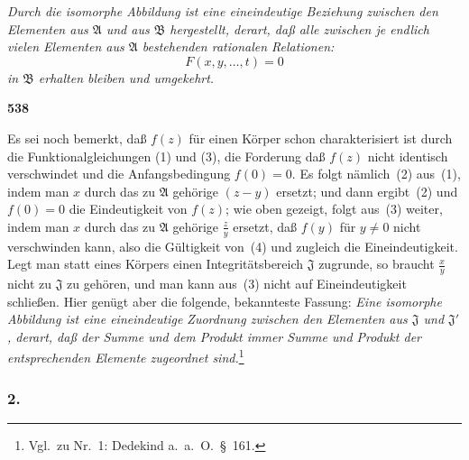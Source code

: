 \documentclass[12pt,a4paper]{article}
\begin{document}
\emph{Durch die isomorphe Abbildung ist eine eineindeutige Beziehung zwischen den Elementen aus $\mathfrak{A}$ und aus $\mathfrak{B}$ hergestellt, derart, da\ss{} alle zwischen je endlich vielen Elementen aus $\mathfrak{A}$ bestehenden rationalen Relationen:
\[F(x, y, \ldots, t) = 0\]
in $\mathfrak{B}$ erhalten bleiben und umgekehrt.}

\newpage
\begin{center}
\textbf{538}
\end{center}

Es sei noch bemerkt, da\ss{} $f(z)$ f\"ur einen K\"orper schon charakterisiert ist durch die Funktionalgleichungen (1) und (3), die Forderung da\ss{} $f(z)$ nicht identisch verschwindet und die Anfangsbedingung $f(0) = 0$. Es folgt n\"amlich~(2) aus~(1), indem man $x$ durch das zu $\mathfrak{A}$ geh\"orige $(z-y)$ ersetzt; und dann ergibt~(2) und $f(0) = 0$ die Eindeutigkeit von $f(z)$; wie oben gezeigt, folgt aus~(3) weiter, indem man $x$ durch das zu $\mathfrak{A}$ geh\"orige $\frac{z}{y}$ ersetzt, da\ss{} $f(y)$ f\"ur $y \neq 0$ nicht verschwinden kann, also die G\"ultigkeit von~(4) und zugleich die Eineindeutigkeit. Legt man statt eines K\"orpers einen Integrit\"atsbereich $\mathfrak{J}$ zugrunde, so braucht $\frac{x}{y}$ nicht zu $\mathfrak{J}$ zu geh\"oren, und man kann aus~(3) nicht auf Eineindeutigkeit schlie\ss en. Hier gen\"ugt aber die folgende, bekannteste Fassung: \emph{Eine isomorphe Abbildung ist eine eineindeutige Zuordnung zwischen den Elementen aus $\mathfrak{J}$ und $\mathfrak{J}'$, derart, da\ss{} der Summe und dem Produkt immer Summe und Produkt der entsprechenden Elemente zugeordnet sind.}\footnote{Vgl.\ zu Nr.\ 1: Dedekind a.\ a.\ O.\ \S\ 161.}

\subsubsection*{2.}
\end{document}
